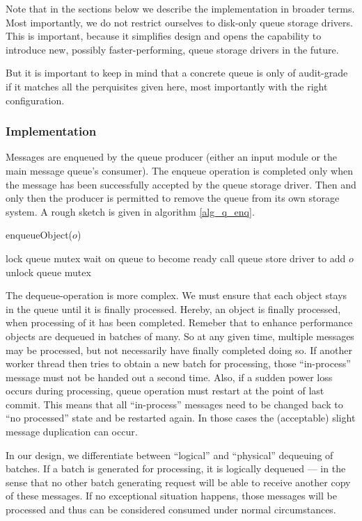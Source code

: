 \documentclass[a4paper,10pt]{article}
\begin{document}
Note that in the sections below we describe the implementation in broader terms. Most importantly, we do not restrict ourselves to disk-only queue storage drivers. This is important, because it simplifies design and opens the capability to introduce new, possibly faster-performing, queue storage drivers in the future.

But it is important to keep in mind that a concrete queue is only of audit-grade if it matches all the perquisites given here, most importantly with the right configuration.

\subsubsection{Implementation}
Messages are enqueued by the queue producer (either an input module or the main message queue's consumer). The enqueue operation is completed only when the message has been successfully accepted by the queue storage driver. Then and only then the producer is permitted to remove the queue from its own storage system. A rough sketch is given in algorithm \ref{alg_q_enq}.

\begin{algorithm}
\caption{enqueueObject($o$)}
\begin{algorithmic}
\label{alg_q_enq}
\STATE lock queue mutex
	\STATE wait on queue to become ready
\ENDWHILE
\STATE call queue store driver to add $o$
\STATE unlock queue mutex
\end{algorithmic}
\end{algorithm}

The dequeue-operation is more complex. We must ensure that each object stays in the queue until it is finally processed. Hereby, an object is finally processed, when processing of it has been completed. Remeber that to enhance performance objects are dequeued in batches of many. So at any given time, multiple messages may be processed, but not necessarily have finally completed doing so. If another worker thread then tries to obtain a new batch for processing, those ``in-process'' message must not be handed out a second time. Also, if a sudden power loss occurs during processing, queue operation must restart at the point of last commit. This means that all ``in-process'' messages need to be changed back to ``no processed'' state and be restarted again. In those cases the (acceptable) slight message duplication can occur.

In our design, we differentiate between ``logical'' and ``physical'' dequeuing of batches. If a batch is generated for processing, it is logically dequeued --- in the sense that no other batch generating request will be able to receive another copy of these messages. If no exceptional situation happens, those messages will be processed and thus can be considered consumed under normal circumstances.
\end{document}
